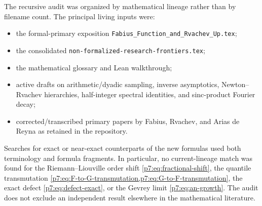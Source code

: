 \documentclass[11pt,oneside]{article}
\theoremstyle{definition}
\theoremstyle{remark}
\newcommand{\1}{\mathbf 1}
\begin{document}
The recursive audit was organized by mathematical lineage rather than by filename count.
The principal living inputs were:
\begin{itemize}
\item the formal-primary exposition \texttt{Fabius\_Function\_and\_Rvachev\_Up.tex};
\item the consolidated \texttt{non-formalized-research-frontiers.tex};
\item the mathematical glossary and Lean walkthrough;
\item active drafts on arithmetic/dyadic sampling, inverse asymptotics, Newton--Rvachev
      hierarchies, half-integer spectral identities, and sinc-product Fourier decay;
\item corrected/transcribed primary papers by Fabius, Rvachev, and Arias de Reyna as retained
      in the repository.
\end{itemize}

Searches for exact or near-exact counterparts of the new formulas used both terminology and
formula fragments.  In particular, no current-lineage match was found for the
Riemann--Liouville order shift \cref{p7:eq:fractional-shift}, the quantile transmutation
\cref{p7:eq:F-to-G-transmutation,p7:eq:G-to-F-transmutation}, the exact defect
\cref{p7:eq:defect-exact}, or the Gevrey limit \cref{p7:eq:an-growth}.  The audit does not exclude an
independent result elsewhere in the mathematical literature.
\end{document}
